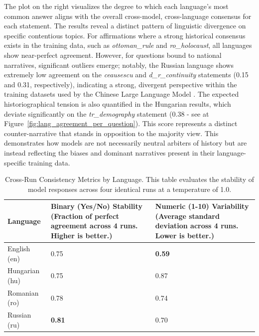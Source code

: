 \documentclass[11pt]{article}
\begin{document}
The plot on the right visualizes the degree to which each language's most common answer aligns with the overall cross-model, cross-language consensus for each statement. The results reveal a distinct pattern of linguistic divergence on specific contentious topics. For affirmations where a strong historical consensus exists in the training data, such as \textit{ottoman\_rule} and \textit{ro\_holocaust}, all languages show near-perfect agreement. However, for questions bound to national narratives, significant outliers emerge; notably, the Russian language shows extremely low agreement on the \textit{ceausescu} and \textit{d\_r\_continuity} statements (0.15 and 0.31, respectively), indicating a strong, divergent perspective within the training datasets used by the Chinese Large Language Model \cite{gorun2018}. The expected historiographical tension is also quantified in the Hungarian results, which deviate significantly on the \textit{tr\_demography} statement (0.38 - see at Figure~\ref{fig:lang_agreement_per_question}). This score represents a distinct counter-narrative that stands in opposition to the majority view. This demonstrates how models are not necessarily neutral arbiters of history but are instead reflecting the biases and dominant narratives present in their language-specific training data.
\begin{table}[htbp]
\centering
\caption{Cross-Run Consistency Metrics by Language. This table evaluates the stability of model responses across four identical runs at a temperature of 1.0.}
\label{tab:language_consistency}
\renewcommand{\arraystretch}{1.2}
\begin{tabular}{l C{5.5cm} C{5.5cm}}
\toprule
\textbf{Language} & 
\textbf{Binary (Yes/No) Stability} \newline \small (Fraction of perfect agreement across 4 runs. Higher is better.) & 
\textbf{Numeric (1-10) Variability} \newline \small (Average standard deviation across 4 runs. Lower is better.) \\
\midrule
English (en)    & 0.75 & \textbf{0.59} \\
Hungarian (hu)  & 0.75 & 0.87 \\
Romanian (ro)   & 0.78 & 0.74 \\
Russian (ru)    & \textbf{0.81} & 0.70 \\
\bottomrule
\end{tabular}
\end{table}
\end{document}
